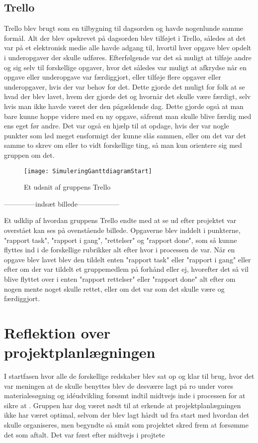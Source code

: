\subsection{Trello}\label{Trello}
Trello blev brugt som en tilbygning til dagsorden og havde nogenlunde samme formål. Alt der blev opskrevet på dagsorden blev tilføjet i Trello, således at det var på et elektronisk medie alle havde adgang til, hvortil hver opgave blev opdelt i underopgaver der skulle udføres. Efterfølgende var det så muligt at tilføje andre og sig selv til forskellige opgaver, hvor det således var muligt at afkrydse når en opgave eller underopgave var færdiggjort, eller tilføje flere  opgaver eller underopgaver, hvis der var behov for det. Dette gjorde det muligt for folk at se hvad der blev lavet, hvem der gjorde det og hvornår det skulle være færdigt, selv hvis man ikke havde været der den pågældende dag. Dette gjorde også at man bare kunne hoppe videre med en ny opgave, såfremt man skulle blive færdig med ens eget før andre. Det var også en hjælp til at opdage, hvis der var nogle punkter som lød meget ensformigt der kunne slås sammen, eller om det var det samme to skrev om eller to vidt forskellige ting, så man kun orientere sig med gruppen om det. 

\begin{figure}[h]
\texttt{[image: SimuleringGanttdiagramStart]}
\centering
\caption{Et udsnit af gruppens Trello}\label{Gantt-diagram-picture}
\end{figure}
--------------indsæt billede------------------

Et udklip af hvordan gruppens Trello endte med at se ud efter projektet var overstået kan ses på ovenstående billede. Opgaverne blev inddelt i punkterne, "rapport task", "rapport i gang", "rettelser" og "rapport done", som så kunne flyttes ind i de forskellige rubrikker alt efter hvor i processen de var. Når en opgave blev lavet blev den tildelt enten "rapport task" eller "rapport i gang" eller efter om der var tildelt et gruppemedlem på forhånd eller ej, hvorefter det så vil blive flyttet over i enten "rapport rettelser" eller "rapport done" alt efter om nogen mente noget skulle rettet, eller om det var som det skulle være og færdiggjort.

\section{Reflektion over projektplanlægningen}\label{Reflektion-over-projektplanlaegningen}
I startfasen hvor alle de forskellige redskaber blev sat op og klar til brug, hvor det var meningen at de skulle benyttes blev de desværre lagt på ro under vores materialesøgning og idéudvikling forsømt indtil midtvejs inde i processen for at sikre at  . Gruppen har dog været nødt til at erkende at projektplanlægningen ikke har været optimal, selvom der blev lagt hårdt ud fra start med hvordan det skulle organiseres, men begyndte så småt som projektet skred frem at forsømme det som aftalt. Det var først efter midtvejs i projtete